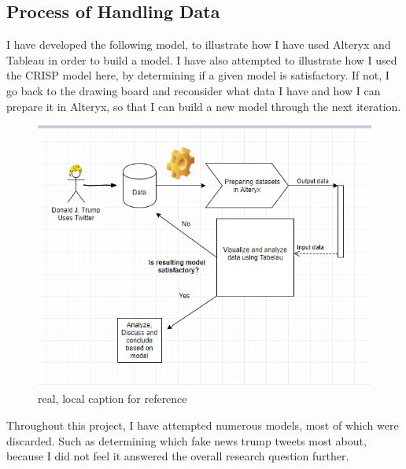 \documentclass[11pt]{article}
\begin{document}
\subsection{Process of Handling Data}

I have developed the following model, to illustrate how I have used Alteryx and Tableau in order to build a model. I have also attempted to illustrate how I used the CRISP model here, by determining if a given model is satisfactory. If not, I go back to the drawing board and reconsider what data I have and how I can prepare it in Alteryx, so that I can build a new model through the next iteration.



\begin{figure}[H] %
	\centering %
\includegraphics [scale= .85]  {SygModel.PNG}    %
	\caption[Optional caption] {real, local caption for reference}
	\label{fig:wordcloudBliz}

\end{figure}


Throughout this project, I have attempted numerous models, most of which were discarded. Such as determining which fake news trump tweets most about, because I did not feel it answered the overall research question further.
\end{document}
